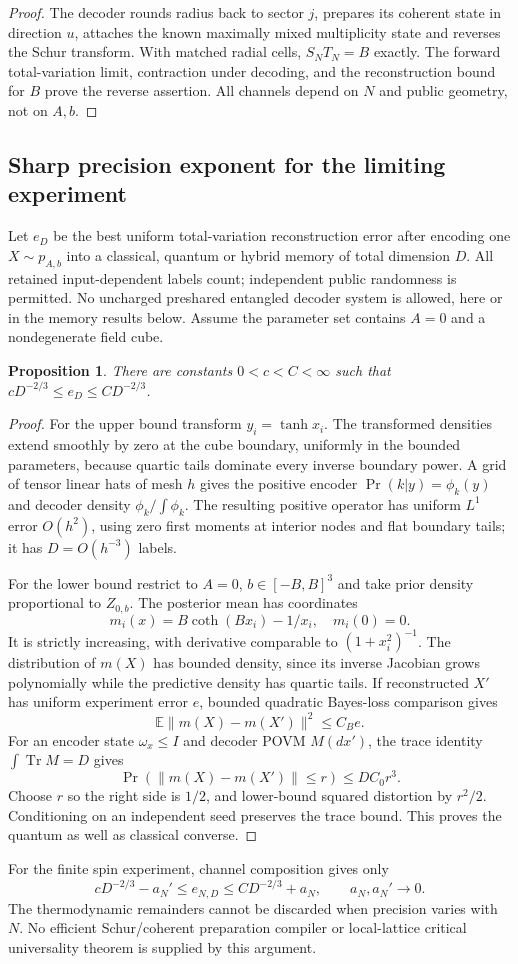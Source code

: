 \documentclass[11pt]{article}
\newtheorem{proposition}[theorem]{Proposition}
\newcommand{\Tr}{\operatorname{Tr}}
\begin{document}
\begin{proof}
The decoder rounds radius back to sector $j$, prepares its coherent state in direction $u$, attaches the known maximally mixed multiplicity state and reverses the Schur transform. With matched radial cells, $S_NT_N=B$ exactly. The forward total-variation limit, contraction under decoding, and the reconstruction bound for $B$ prove the reverse assertion. All channels depend on $N$ and public geometry, not on $A,b$.
\end{proof}

\subsection{Sharp precision exponent for the limiting experiment}
Let $e_D$ be the best uniform total-variation reconstruction error after encoding one $X\sim p_{A,b}$ into a classical, quantum or hybrid memory of total dimension $D$. All retained input-dependent labels count; independent public randomness is permitted. No uncharged preshared entangled decoder system is allowed, here or in the memory results below. Assume the parameter set contains $A=0$ and a nondegenerate field cube.
\begin{proposition}
There are constants $0<c<C<\infty$ such that $cD^{-2/3}\leq e_D\leq CD^{-2/3}$.
\end{proposition}
\begin{proof}
For the upper bound transform $y_i=\tanh x_i$. The transformed densities extend smoothly by zero at the cube boundary, uniformly in the bounded parameters, because quartic tails dominate every inverse boundary power. A grid of tensor linear hats of mesh $h$ gives the positive encoder $\Pr(k|y)=\phi_k(y)$ and decoder density $\phi_k/\int\phi_k$. The resulting positive operator has uniform $L^1$ error $O(h^2)$, using zero first moments at interior nodes and flat boundary tails; it has $D=O(h^{-3})$ labels.

For the lower bound restrict to $A=0$, $b\in[-B,B]^3$ and take prior density proportional to $Z_{0,b}$. The posterior mean has coordinates
\[
 m_i(x)=B\coth(Bx_i)-1/x_i,\quad m_i(0)=0.
\]
It is strictly increasing, with derivative comparable to $(1+x_i^2)^{-1}$. The distribution of $m(X)$ has bounded density, since its inverse Jacobian grows polynomially while the predictive density has quartic tails. If reconstructed $X'$ has uniform experiment error $e$, bounded quadratic Bayes-loss comparison gives
\[
 \mathbb E\|m(X)-m(X')\|^2\leq C_Be.
\]
For an encoder state $\omega_x\leq I$ and decoder POVM $M(dx')$, the trace identity $\int\Tr M=D$ gives
\[
 \Pr(\|m(X)-m(X')\|\leq r)\leq D C_0r^3.
\]
Choose $r$ so the right side is $1/2$, and lower-bound squared distortion by $r^2/2$. Conditioning on an independent seed preserves the trace bound. This proves the quantum as well as classical converse.
\end{proof}
For the finite spin experiment, channel composition gives only
\[
 cD^{-2/3}-a_N'\leq e_{N,D}\leq CD^{-2/3}+a_N,
 \qquad a_N,a_N'\to0.
\]
The thermodynamic remainders cannot be discarded when precision varies with $N$. No efficient Schur/coherent preparation compiler or local-lattice critical universality theorem is supplied by this argument.
\end{document}
